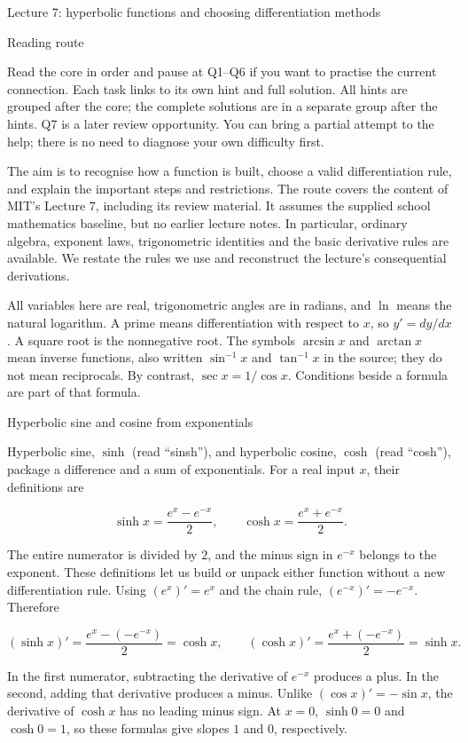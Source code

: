 \documentclass[
  11pt,
]{article}
\author{}
\date{}
\begin{document}
Lecture 7: hyperbolic functions and choosing differentiation methods

Reading route

Read the core in order and pause at Q1--Q6 if you want to practise the
current connection. Each task links to its own hint and full solution.
All hints are grouped after the core; the complete solutions are in a
separate group after the hints. Q7 is a later review opportunity. You
can bring a partial attempt to the help; there is no need to diagnose
your own difficulty first.

The aim is to recognise how a function is built, choose a valid
differentiation rule, and explain the important steps and restrictions.
The route covers the content of MIT's Lecture 7, including its review
material. It assumes the supplied school mathematics baseline, but no
earlier lecture notes. In particular, ordinary algebra, exponent laws,
trigonometric identities and the basic derivative rules are available.
We restate the rules we use and reconstruct the lecture's consequential
derivations.

All variables here are real, trigonometric angles are in radians, and
\(\ln\) means the natural logarithm. A prime means differentiation with
respect to \(x\), so \(y'=dy/dx\). A square root is the nonnegative
root. The symbols \(\arcsin x\) and \(\arctan x\) mean inverse
functions, also written \(\sin^{-1}x\) and \(\tan^{-1}x\) in the source;
they do not mean reciprocals. By contrast, \(\sec x=1/\cos x\).
Conditions beside a formula are part of that formula.

Hyperbolic sine and cosine from exponentials

Hyperbolic sine, \(\sinh\) (read ``sinsh''), and hyperbolic cosine,
\(\cosh\) (read ``cosh''), package a difference and a sum of
exponentials. For a real input \(x\), their definitions are

\[\sinh x=\frac{e^x-e^{-x}}2,
\qquad
\cosh x=\frac{e^x+e^{-x}}2.\]

The entire numerator is divided by \(2\), and the minus sign in
\(e^{-x}\) belongs to the exponent. These definitions let us build or
unpack either function without a new differentiation rule. Using
\((e^x)'=e^x\) and the chain rule, \((e^{-x})'=-e^{-x}\). Therefore

\[(\sinh x)'=\frac{e^x-(-e^{-x})}{2}=\cosh x,
\qquad
(\cosh x)'=\frac{e^x+(-e^{-x})}{2}=\sinh x.\]

In the first numerator, subtracting the derivative of \(e^{-x}\)
produces a plus. In the second, adding that derivative produces a minus.
Unlike \((\cos x)'=-\sin x\), the derivative of \(\cosh x\) has no
leading minus sign. At \(x=0\), \(\sinh0=0\) and \(\cosh0=1\), so these
formulas give slopes \(1\) and \(0\), respectively.
\end{document}
